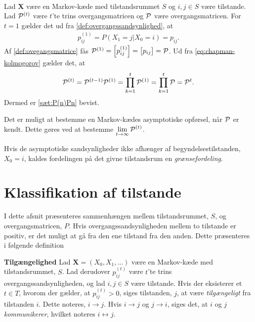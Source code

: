 \begin{bev}\textbf{}\\
Lad $\bm X$ være en Markov-kæde med tilstandsrummet $S$ og $i,j\in S$ være tilstande. Lad $\P^{(t)}$ være $t$'te trins overgangsmatricen og $\P$ være overgangsmatricen. For $t=1$ gælder det ud fra \autoref{def:overgangssandsynlighed}, at
\begin{align*}
    p_{ij}^{(1)} = P(X_1=j|X_0=i) = p_{ij}.
\end{align*}
Af \autoref{def:ovegangsmatrice} fås $\P^{(1)} = \left[p_{ij}^{(1)}\right] = \left[p_{ij}\right]= \P$. Ud fra \eqref{eq:chapman-kolmogorov} gælder det, at
\begin{align*}
    \P^{(t)}= \P^{(t-1)}\P^{(1)}=\prod_{k=1}^{t} \P^{(1)} = %
    \prod_{k=1}^{t} \P = \P^{t}.
\end{align*}
Dermed er \autoref{sæt:P(n)Pn} bevist.
\end{bev}

Det er muligt at bestemme en Markov-kædes asymptotiske opførsel, når $\P$ er kendt. Dette gøres ved at bestemme $\displaystyle \lim_{t \to \infty} \P^{(t)}$.

Hvis de asymptotiske sandsynligheder ikke afhænger af begyndelsestilstanden, $X_0=i$, kaldes fordelingen på det givne tilstandsrum en \textit{grænsefordeling}.


\section{Klassifikation af tilstande}

I dette afsnit præsenteres sammenhængen mellem tilstandsrummet, $S$, og overgangsmatricen, $P$. Hvis overgangssandsynligheden mellem to tilstande er positiv, er det muligt at gå fra den ene tilstand fra den anden. Dette præsenteres i følgende definition

\begin{minipage}\textwidth
\begin{defn}\textbf{Tilgængelighed} \label{def:tilgængelighed} %
\newline
Lad $\bm X = (X_0, X_1, \dots)$ være en Markov-kæde med tilstandsrummet, $S$. Lad derudover $p_{ij}^{(t)}$ være $t$'te trins overgangssandsynligheden, og lad $i,j \in S$ være tilstande. Hvis der eksisterer et $t\in T$, hvorom der gælder, at $p_{ij}^{(t)}>0$, siges tilstanden, $j$, at være \textit{tilgængeligt} fra tilstanden $i$. Dette noteres, $i\to j$. Hvis $i\to j$ og $j\to i$, siges det, at $i$ og $j$ \textit{kommunikerer}, hvilket noteres $i\leftrightarrow j$.
\end{defn}
\end{minipage}

